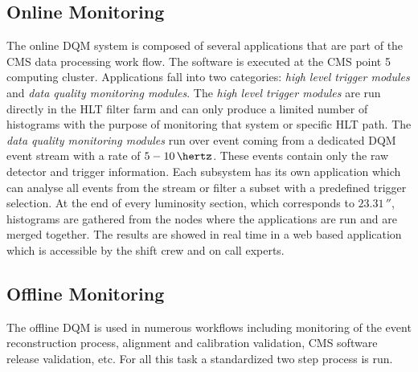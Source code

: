 \subsection{Online Monitoring}
\label{SECTION:TechnicalWork_DataQualityMonitoring_OnlineMonitoring}


The online \gls{DQM} system is composed of several applications that are part of the \gls{CMS} data processing work flow. The software is executed at the \gls{CMS} point 5 computing cluster. Applications fall into two categories: \textit{high level trigger modules} and \textit{data quality monitoring modules}. The \textit{high level trigger modules} are run directly in the \gls{HLT} filter farm and can only produce a limited number of histograms with the purpose of monitoring that system or specific \gls{HLT} path. The \textit{data quality monitoring modules} run over event coming from a dedicated \gls{DQM} event stream with a rate of $5-10\,\hertz$. These events contain only the raw detector and trigger information. Each subsystem has its own application which can analyse all events from the stream or filter a subset with a predefined trigger selection. At the end of every luminosity section, which corresponds to $23.31\,\second$, histograms are gathered from the nodes where the applications are run and are merged together. The results are showed in real time in a web based application which is accessible by the shift crew and on call experts.

\subsection{Offline Monitoring}
\label{SECTION:TechnicalWork_DataQualityMonitoring_OfflineMonitoring}


The offline \gls{DQM} is used in numerous workflows including monitoring of the event reconstruction process, alignment and calibration validation, \gls{CMS} software release validation, etc. For all this task a standardized two step process is run. 

